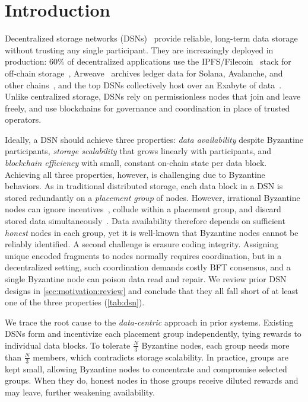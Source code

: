 \section{Introduction}
\label{sec:intro}

Decentralized storage networks (DSNs)~\cite{filecoin,sia,shelby,permacoin,retricoin,arweave,walrus,bft-dsn,swarm} provide reliable, long-term data storage without trusting any single participant.
They are increasingly deployed in production:
60\% of decentralized applications use the IPFS/Filecoin~\cite{filecoin} stack for off-chain storage~\cite{filecoin-web3}, Arweave~\cite{arweave} archives ledger data for Solana, Avalanche, and other chains~\cite{arweave-solana,arweave-blockchains}, and the top DSNs collectively host over an Exabyte of data~\cite{filecoin-size}.
Unlike centralized storage, DSNs rely on permissionless nodes that join and leave freely, and use blockchains for governance and coordination in place of trusted operators.

Ideally, a DSN should achieve three properties: \emph{data availability} despite Byzantine participants, \emph{storage scalability} that grows linearly with participants, and \emph{blockchain efficiency} with small, constant on-chain state per data block.
Achieving all three properties, however, is challenging due to Byzantine behaviors.
As in traditional distributed storage, each data block in a DSN is stored redundantly on a \emph{placement group} of nodes.
However, irrational Byzantine nodes can ignore incentives~\cite{bar}, collude within a placement group, and discard stored data simultaneously~\cite{ipfs-attack,bittorrent-attack}.
Data availability therefore depends on sufficient \emph{honest} nodes in each group, yet it is well-known that Byzantine nodes cannot be reliably identified.
A second challenge is erasure coding integrity.
Assigning unique encoded fragments to nodes normally requires coordination, but in a decentralized setting, such coordination demands costly BFT consensus, and a single Byzantine node can poison data read and repair.
We review prior DSN designs in \cref{sec:motivation:review} and conclude that they all fall short of at least one of the three properties (\cref{tab:dsn}).

We trace the root cause to the \emph{data-centric} approach in prior systems.
Existing DSNs form and incentivize each placement group independently, tying rewards to individual data blocks.
To tolerate $\frac{N}{3}$ Byzantine nodes, each group needs more than $\frac{N}{3}$ members, which contradicts storage scalability.
In practice, groups are kept small, allowing Byzantine nodes to concentrate and compromise selected groups.
When they do, honest nodes in those groups receive diluted rewards and may leave, further weakening availability.

